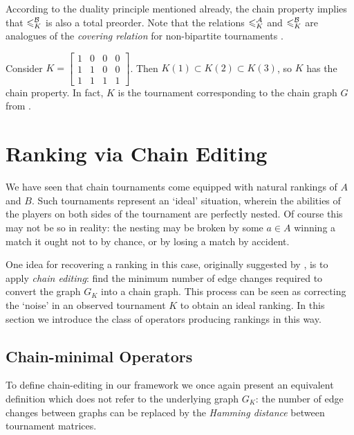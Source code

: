 According to the duality principle mentioned already, the chain property
implies that $\leqslant^{\mathcal{B}}_K$ is also a total preorder. Note that the relations
$\leqslant^{\mathcal{A}}_K$ and $\leqslant^{\mathcal{B}}_K$ are analogues of the \emph{covering relation} for
non-bipartite tournaments \cite{brandt2016a}.

\begin{example}
    Consider
    $
        K = \left[\begin{smallmatrix}
            1 & 0 & 0 & 0 \\
            1 & 1 & 0 & 0 \\
            1 & 1 & 1 & 1
        \end{smallmatrix}\right]
    $. Then $K(1) \subset K(2) \subset K(3)$, so $K$ has the chain
    property.  In fact, $K$ is the tournament corresponding to the chain graph
    $G$ from .

\end{example}

\section{Ranking via Chain Editing}
\label{tourn_sec_ranking_via_chain_editing}

We have seen that chain tournaments
come equipped with natural rankings of $A$ and $B$. Such tournaments represent
an `ideal' situation, wherein the abilities of the players on both sides of the
tournament are perfectly nested. Of course this may not be so in reality:
the nesting may be broken by some $a \in A$ winning a match it ought not to by
chance, or by losing a match by accident.

One idea for recovering a ranking in this case, originally suggested
by \textcite{jiao2017algorithms}, is to apply \emph{chain editing}: find the
minimum number of edge changes required to convert the graph $G_K$ into a chain
graph. This process can be seen as correcting the `noise' in an observed
tournament $K$ to obtain an ideal ranking. In this section we introduce the
class of operators producing rankings in this way.

\subsection{Chain-minimal Operators}

To define chain-editing in our framework we once again present an equivalent
definition which does not refer to the underlying graph $G_K$: the number of
edge changes between graphs can be replaced by the \emph{Hamming distance}
between tournament matrices.

